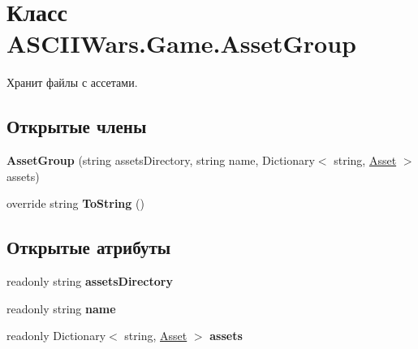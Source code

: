 \hypertarget{class_a_s_c_i_i_wars_1_1_game_1_1_asset_group}{}\section{Класс A\+S\+C\+I\+I\+Wars.\+Game.\+Asset\+Group}
\label{class_a_s_c_i_i_wars_1_1_game_1_1_asset_group}


Хранит файлы с ассетами.  


\subsection*{Открытые члены}
\begin{DoxyCompactItemize}
\item 
\hypertarget{class_a_s_c_i_i_wars_1_1_game_1_1_asset_group_a0477f5fe9d3a2828e2ef4c2ddb7aa565}{}\label{class_a_s_c_i_i_wars_1_1_game_1_1_asset_group_a0477f5fe9d3a2828e2ef4c2ddb7aa565} 
{\bfseries Asset\+Group} (string assets\+Directory, string name, Dictionary$<$ string, \hyperlink{class_a_s_c_i_i_wars_1_1_game_1_1_asset}{Asset} $>$ assets)
\item 
\hypertarget{class_a_s_c_i_i_wars_1_1_game_1_1_asset_group_a16cbe328487eba763e92bb4551a67311}{}\label{class_a_s_c_i_i_wars_1_1_game_1_1_asset_group_a16cbe328487eba763e92bb4551a67311} 
override string {\bfseries To\+String} ()
\end{DoxyCompactItemize}
\subsection*{Открытые атрибуты}
\begin{DoxyCompactItemize}
\item 
\hypertarget{class_a_s_c_i_i_wars_1_1_game_1_1_asset_group_a6c7083ec7602a32f4e99601ef5d54397}{}\label{class_a_s_c_i_i_wars_1_1_game_1_1_asset_group_a6c7083ec7602a32f4e99601ef5d54397} 
readonly string {\bfseries assets\+Directory}
\item 
\hypertarget{class_a_s_c_i_i_wars_1_1_game_1_1_asset_group_aeb6e4bd616bf065ce4a04f5c34e9c3d9}{}\label{class_a_s_c_i_i_wars_1_1_game_1_1_asset_group_aeb6e4bd616bf065ce4a04f5c34e9c3d9} 
readonly string {\bfseries name}
\item 
\hypertarget{class_a_s_c_i_i_wars_1_1_game_1_1_asset_group_ae2481944ac1b6ebe0f4e383ef7de141c}{}\label{class_a_s_c_i_i_wars_1_1_game_1_1_asset_group_ae2481944ac1b6ebe0f4e383ef7de141c} 
readonly Dictionary$<$ string, \hyperlink{class_a_s_c_i_i_wars_1_1_game_1_1_asset}{Asset} $>$ {\bfseries assets}
\end{DoxyCompactItemize}
